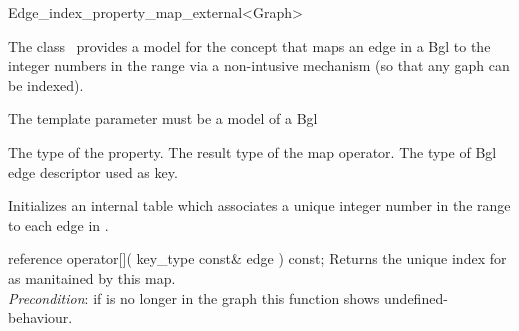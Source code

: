 

\begin{ccRefClass}{Edge_index_property_map_external<Graph>}


\ccDefinition

The class \ccRefName\ provides a model for the concept 
that maps an edge in a {\sc Bgl}
to the integer numbers in the range 
via a non-intusive mechanism (so that any gaph can be indexed).

The template parameter  must be a model of a {\sc Bgl}


\ccTypes
    {The type of the property.}
\ccGlue
    {The result type of the map operator.}
\ccGlue
\ccGlue
  {The type of {\sc Bgl} edge descriptor used as key.}

\ccCreation
{}  %

{Initializes an internal table which associates a unique integer
number in the range  to each edge in .}

\ccOperations

\ccMethod
  {reference operator[]( key_type const& edge ) const;}
  {Returns the unique index for  as manitained by this map.\\
  {\em Precondition}: if  is no longer in the graph this function shows undefined-behaviour.
  }
    
\ccIsModel
{} 

\ccSeeAlso
{}\\

\end{ccRefClass}


